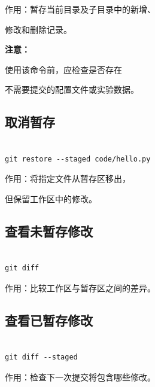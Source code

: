 作用：暂存当前目录及子目录中的新增、

修改和删除记录。



\textbf{注意：}

使用该命令前，应检查是否存在

不需要提交的配置文件或实验数据。



\subsection{取消暂存}



\begin{lstlisting}

git restore --staged code/hello.py

\end{lstlisting}



作用：将指定文件从暂存区移出，

但保留工作区中的修改。



\subsection{查看未暂存修改}



\begin{lstlisting}

git diff

\end{lstlisting}



作用：比较工作区与暂存区之间的差异。



\subsection{查看已暂存修改}



\begin{lstlisting}

git diff --staged

\end{lstlisting}



作用：检查下一次提交将包含哪些修改。






